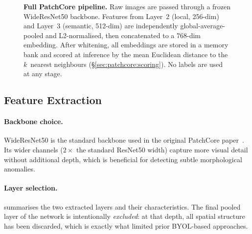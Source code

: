 \begin{figure}[H]
{%
}
\caption{%
  \textbf{Full PatchCore pipeline.}
  Raw images are passed through a frozen WideResNet50 backbone.
  Features from Layer~2 (local, 256-dim) and Layer~3 (semantic, 512-dim)
  are independently global-average-pooled and L2-normalised, then
  concatenated to a 768-dim embedding.
  After whitening, all embeddings are stored in a memory bank and
  scored at inference by the mean Euclidean distance to the $k$~nearest
  neighbours (\S\ref{sec:patchcore:scoring}).
  No labels are used at any stage.}
\label{fig:pipeline}
\end{figure}

\subsection{Feature Extraction}
\label{sec:patchcore:features}

\paragraph{Backbone choice.}
WideResNet50 \citep{Zagoruyko2016} is the standard backbone used in the
original PatchCore paper~\citep{Roth2022}.  Its wider channels
($2\times$ the standard ResNet50 width) capture more visual detail
without additional depth, which is beneficial for detecting subtle
morphological anomalies.

\paragraph{Layer selection.}
 summarises the two extracted layers and their
characteristics.  The final pooled layer of the network is intentionally
\emph{excluded}: at that depth, all spatial structure has been discarded,
which is exactly what limited prior BYOL-based approaches.

